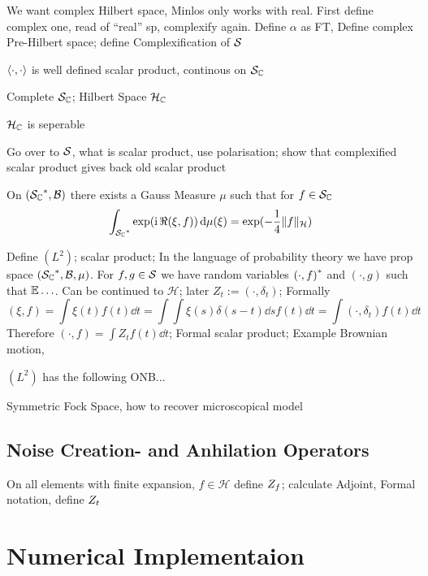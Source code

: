 We want complex Hilbert space, Minlos only works with real. First define complex one, read of ``real'' sp, complexify again. Define $\alpha$ as FT, Define complex Pre-Hilbert space; define Complexification of $\SchwartzS$
\begin{lem}
  $\sp{\cdot}{\cdot}$ is well defined scalar product, continous on $\SchwartzS_\Complex$
\end{lem}
Complete $\SchwartzS_\Complex$; Hilbert Space $\mathcal{H}_\Complex$
\begin{lem}
  $\mathcal{H}_\Complex$ is seperable
\end{lem}

Go over to $\SchwartzS$, what is scalar product, use polarisation; show that complexified scalar product gives back old scalar product
\begin{thm} \label{thm:mp_existence}
  On $(\dual{\mathcal{S}_\Complex}, \mathcal{B})$ there exists a Gauss Measure $\mu$ such that for $f \in \SchwartzS_\Complex$
  \begin{equation}
    \label{eq:mp_fourier_gauss}
    \int_{\dual{\SchwartzS_\Complex}} \exp{\left(\ii \, \Re(\xi, f)\right)} \dd\mu(\xi) = \exp(-\frac{1}{4} \Vert f \Vert_\mathcal{H})
  \end{equation}
\end{thm}

Define $(L^2)$; scalar product; In the language of probability theory we have prop space $(\dual{\SchwartzS_\Complex}, \mathcal{B}, \mu)$. For $f,g \in \SchwartzS$ we have random variables $\cc{(\cdot, f)}$ and $(\cdot, g)$ such that $\E \ldots$. Can be continued to $\mathcal{H}$; later $Z_t := (\cdot, \delta_t)$; Formally
  \begin{equation*}
  (\xi, f) = \int \xi(t) f(t) \dd t = \int \int \xi(s) \delta(s-t) \dd s f(t) \dd t = \int (\cdot, \delta_t) f(t) \dd t 
  \end{equation*}
Therefore $(\cdot, f) = \int Z_t f(t) \dd t$; Formal scalar product; Example Brownian motion, 

  \begin{thm} \label{thm:mp_expansion}
  $(L^2)$ has the following ONB...
  \end{thm}
Symmetric Fock Space, how to recover microscopical model


\section{Noise Creation- and Anhilation Operators}
\label{sec:math.operators}

On all elements with finite expansion, $f \in \mathcal{H}$ define $\op Z_f$; calculate Adjoint, Formal notation, define $\op Z_t$




\chapter{Numerical Implementaion}
\label{cha:implement}
